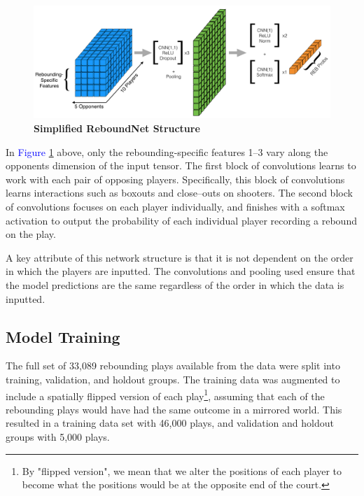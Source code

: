 \documentclass{article}
\begin{document}
\begin{figure}[htb]
\centering
\includegraphics[width=1\columnwidth]{Modeling_Process.png}
\caption{\bf{Simplified ReboundNet Structure}}
\label{fig:Modeling_Process}
\end{figure}

\bigbreak
\noindent
In \textcolor{blue}{Figure} \ref{fig:Modeling_Process} above, only the rebounding-specific features 1--3 vary along the opponents dimension of the input tensor. The first block of convolutions learns to work with each pair of opposing players. Specifically, this block of convolutions learns interactions such as boxouts and close--outs on shooters. The second block of convolutions focuses on each player individually, and finishes with a softmax activation to output the probability of each individual player recording a rebound on the play.

\bigbreak
\noindent
A key attribute of this network structure is that it is not dependent on the order in which the players are inputted. The convolutions and pooling used ensure that the model predictions are the same regardless of the order in which the data is inputted.

\subsection{Model Training}
\noindent
The full set of 33,089 rebounding plays available from the data were split into training, validation, and holdout groups. The training data was augmented to include a spatially flipped version of each play\footnote{By "flipped version", we mean that we alter the positions of each player to become what the positions would be at the opposite end of the court.}, assuming that each of the rebounding plays would have had the same outcome in a mirrored world. This resulted in a training data set with 46,000 plays, and validation and holdout groups with 5,000 plays.
\end{document}
